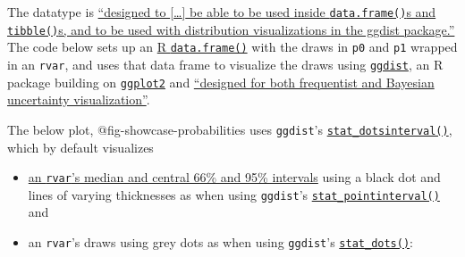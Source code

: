\documentclass[
]{article}
\providecommand{\tightlist}{%
  \setlength{\itemsep}{0pt}\setlength{\parskip}{0pt}}
\begin{document}
The datatype is
\href{https://mc-stan.org/posterior/articles/rvar.html\#:~:text=designed\%20to\%20interoperate\%20with\%20vectorized\%20distributions\%20in\%20the\%20distributional\%20package\%2C\%20to\%20be\%20able\%20to\%20be\%20used\%20inside\%20data.frame()s\%20and\%20tibble()s\%2C\%20and\%20to\%20be\%20used\%20with\%20distribution\%20visualizations\%20in\%20the\%20ggdist\%20package.}{``designed
to {[}\ldots{]} be able to be used inside \texttt{data.frame()}s and
\texttt{tibble()}s, and to be used with distribution visualizations in
the ggdist package.''} The code below sets up an
\href{https://www.rdocumentation.org/packages/base/versions/3.6.2/topics/data.frame}{R
\texttt{data.frame()}} with the draws in \texttt{p0} and \texttt{p1}
wrapped in an \texttt{rvar}, and uses that data frame to visualize the
draws using
\href{https://mjskay.github.io/ggdist/index.html}{\texttt{ggdist}}, an R
package building on
\href{https://ggplot2.tidyverse.org/}{\texttt{ggplot2}} and
\href{https://mjskay.github.io/ggdist/index.html\#:~:text=designed\%20for\%20both\%20frequentist\%20and\%20Bayesian\%20uncertainty\%20visualization}{``designed
for both frequentist and Bayesian uncertainty visualization''}.

The below plot, @fig-showcase-probabilities uses \texttt{ggdist}'s
\href{https://mjskay.github.io/ggdist/articles/dotsinterval.html}{\texttt{stat\_dotsinterval()}},
which by default visualizes

\begin{itemize}
\tightlist
\item
  \href{https://mjskay.github.io/ggdist/reference/stat_dotsinterval.html\#:~:text=point_interval\%20\%3D\%20\%22median_qi\%22\%2C\%0A\%20\%20.width\%20\%3D\%20c(0.66\%2C\%200.95)\%2C}{an
  \texttt{rvar}'s median and central 66\% and 95\% intervals} using a
  black dot and lines of varying thicknesses as when using
  \texttt{ggdist}'s
  \href{https://mjskay.github.io/ggdist/reference/stat_pointinterval.html\#examples}{\texttt{stat\_pointinterval()}}
  and
\item
  an \texttt{rvar}'s draws using grey dots as when using
  \texttt{ggdist}'s
  \href{https://mjskay.github.io/ggdist/reference/stat_dots.html\#examples}{\texttt{stat\_dots()}}:
\end{itemize}
\end{document}
